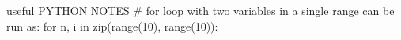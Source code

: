 useful PYTHON NOTES
# for loop with two variables in a single range can be run as:
for n, i in zip(range(10), range(10)):

